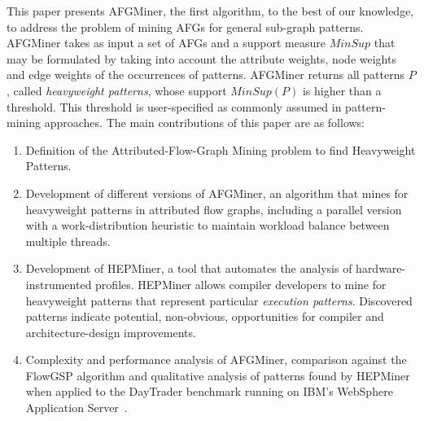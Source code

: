 This paper presents AFGMiner, the first algorithm, to the best of our knowledge, to address the problem of mining AFGs for general sub-graph patterns. AFGMiner takes as input a set of AFGs and a support measure $MinSup$ that may be formulated by taking into account the attribute weights, node weights and edge weights of the occurrences of patterns. AFGMiner returns all patterns $P$, called \emph{heavyweight patterns}, whose support $MinSup(P)$ is higher than a threshold. This threshold is user-specified as commonly assumed in pattern-mining approaches.
The main contributions of this paper are as follows: 

\begin{enumerate}
\item Definition of the Attributed-Flow-Graph Mining problem to find Heavyweight Patterns.

\item Development of different versions of AFGMiner, an algorithm that mines for heavyweight patterns in attributed flow graphs, including a parallel version with a work-distribution heuristic to maintain workload balance between multiple threads.

\item Development of HEPMiner, a tool that automates the analysis of hardware-instrumented profiles. HEPMiner allows compiler developers to mine for heavyweight patterns that represent particular \emph{execution patterns}. Discovered patterns indicate potential, non-obvious, opportunities for compiler and architecture-design improvements.

\item Complexity and performance analysis of AFGMiner, comparison against the FlowGSP algorithm and qualitative analysis of patterns found by HEPMiner when applied to the DayTrader benchmark running on IBM's WebSphere Application Server~\cite{WAS}.
\end{enumerate} 




